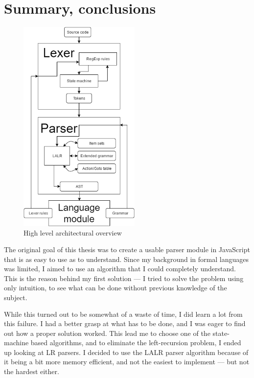 \chapter{Summary, conclusions}
\begingroup
\setlength{\intextsep}{0pt}%
\setlength{\columnsep}{10pt}%
\begin{figure}
\vspace{-90pt}
\begin{center}
\includegraphics[width=60mm,keepaspectratio]{figures/diagram.png}
\end{center}
\vspace{-15pt}
\caption{High level architectural overview}
\end{figure}

The original goal of this thesis was to create a usable parser module in JavaScript that is as easy to use as to understand. Since my background in formal languages was limited, I aimed to use an algorithm that I could completely understand. This is the reason behind my first solution --- I tried to solve the problem using only intuition, to see what can be done without previous knowledge of the subject.

While this turned out to be somewhat of a waste of time, I did learn a lot from this failure. I had a better grasp at what has to be done, and I was eager to find out how a proper solution worked. This lead me to choose one of the state-machine based algorithms, and to eliminate the left-recursion problem, I ended up looking at LR parsers. I decided to use the LALR parser algorithm because of it being a bit more memory efficient, and not the easiest to implement --- but not the hardest either.

